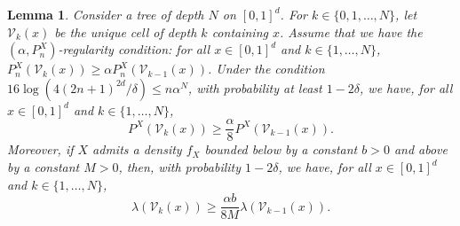\documentclass[paper=a4, fontsize=11pt]{scrartcl}
\newtheorem{lemma}[theorem]{Lemma}
\begin{document}
\begin{lemma}\label{lemmaWager_new}
Consider a tree of depth $N$ on $[0,1]^d$. For $k \in  \{0,1,\dots,N \}$, let $\mathcal{V}_k(x)$ be the unique cell of depth $k$ containing $x$.
 Assume that we have the $(\alpha,P_n^X)$-regularity condition: for all $x\in [0,1]^d$ and  $k \in \{1,\ldots,  N\} $, 
$  P_n^X(\mathcal{V}_{k}(x))  \ge \alpha P_n^X(\mathcal{V}_{k-1}(x))$. Under the condition $16\log( 4 (2n+1)^{2d} / \delta) \leq n \alpha^{N}$, with probability at least $1 - 2\delta$,  we have, for all $x\in [0,1]^d$ and $k \in  \{1,\dots,N \}$, 
\begin{equation*}
 P^X(\mathcal{V}_{k}(x))  \ge \frac{\alpha}{8} P^X(\mathcal{V}_{k-1}(x)).    
\end{equation*}
Moreover, if $X$ admits a density $f_X$ bounded below by a constant $b > 0$ and above by a constant $M > 0$, then, with probability $1-2\delta$,  we have, for all $x\in [0,1]^d$ and $k \in  \{1,\dots,N \}$, 
$$  \lambda(\mathcal{V}_{k}(x)) \geq \frac{\alpha b}{8M} \lambda(\mathcal{V}_{k-1}(x)) .$$
\end{lemma}
\end{document}
